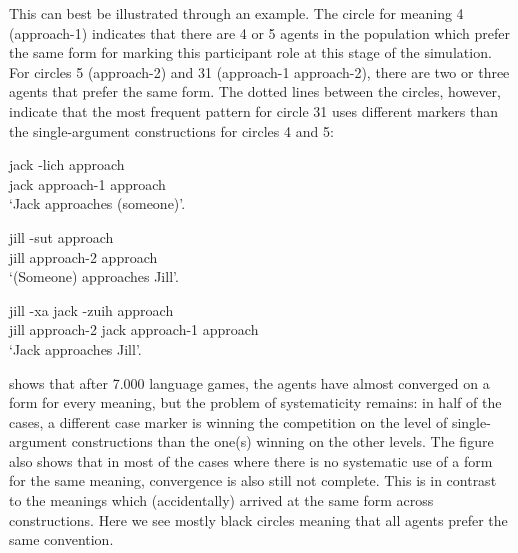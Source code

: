 This can best be illustrated through an example. The circle for meaning 4 (approach-1) indicates that there are 4  or 5 agents in the population which prefer the same form for marking this participant role at this stage of the simulation. For circles 5 (approach-2) and 31 (approach-1 approach-2), there are two or three agents that prefer the same form. The dotted lines between the circles, however, indicate that the most frequent pattern for circle 31 uses different markers than the single-argument constructions for circles 4 and 5:

\ea
\gll jack -lich approach\\
jack approach-1 approach\\
\glt `Jack approaches (someone)'.\\

\item
\gll jill -sut approach\\
jill approach-2 approach\\
\glt `(Someone) approaches Jill'.\\

\item
\gll jill -xa jack -zuih approach\\
jill approach-2 jack approach-1 approach\\
\glt `Jack approaches Jill'.\\
\z

\newpage
{} shows that after 7.000 language games, the agents have almost converged on a form for every meaning, but the problem of systematicity remains: in half of the cases, a different case marker is winning the competition on the level of single-argument constructions than the one(s) winning on the other levels. The figure also shows that in most of the cases where there is no systematic use of a form for the same meaning, convergence is also still not complete. This is in contrast to the meanings which (accidentally) arrived at the same form across constructions. Here we see mostly black circles meaning that all agents prefer the same convention.

